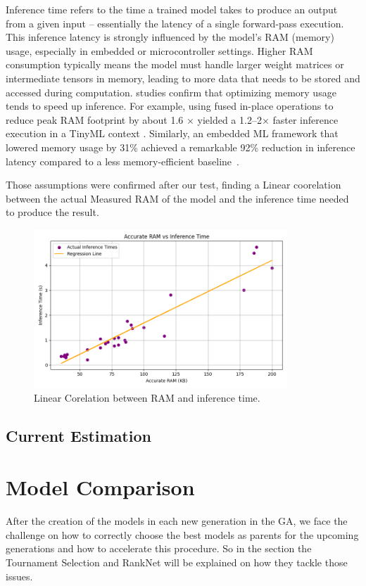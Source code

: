 Inference time refers to the time a trained model takes to produce an output from a given input – essentially the latency of a single forward-pass execution. This inference latency is strongly influenced by the model’s RAM (memory) usage, especially in embedded or microcontroller settings. Higher RAM consumption typically means the model must handle larger weight matrices or intermediate tensors in memory, leading to more data that needs to be stored and accessed during computation.
studies confirm that optimizing memory usage tends to speed up inference. For example, using fused in-place operations to reduce peak RAM footprint by about 1.6 × yielded a 1.2–2× faster inference execution in a TinyML context \cite{inferenceTime1}. Similarly, an embedded ML framework that lowered memory usage by 31\% achieved a remarkable 92\% reduction in inference latency compared to a less memory-efficient baseline~\cite{inferenceTime1}.


Those assumptions were confirmed after our test, finding a Linear coorelation between the actual Measured RAM of the model and the inference time needed to produce the result.

\begin{figure}[h]
  \centering
  \includegraphics[width=0.85\textwidth]{Pictures/inference_time_regression_plot.png}
  \caption{Linear Corelation between RAM and inference time.}
  \label{fig:inference time}
\end{figure}

\clearpage


\subsection{Current Estimation}


\section{Model Comparison}
After the creation of the models in each new generation in the GA, we face the challenge on how to correctly choose the best models as parents for the upcoming generations and how to accelerate this procedure. So in the section the Tournament Selection and RankNet will be explained on how they tackle those issues. 

